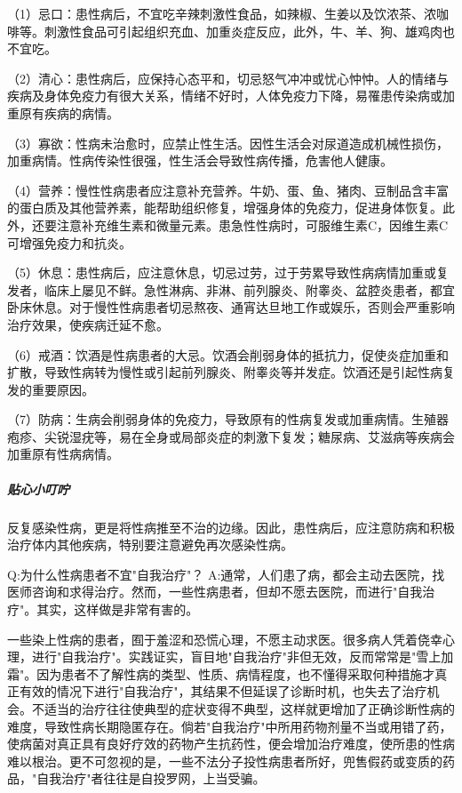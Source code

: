 \documentclass[12pt,UTF8]{ctexbook}
\begin{document}
（1）忌口：患性病后，不宜吃辛辣刺激性食品，如辣椒、生姜以及饮浓茶、浓咖啡等。刺激性食品可引起组织充血、加重炎症反应，此外，牛、羊、狗、雄鸡肉也不宜吃。

（2）清心：患性病后，应保持心态平和，切忌怒气冲冲或忧心忡忡。人的情绪与疾病及身体免疫力有很大关系，情绪不好时，人体免疫力下降，易罹患传染病或加重原有疾病的病情。

（3）寡欲：性病未治愈时，应禁止性生活。因性生活会对尿道造成机械性损伤，加重病情。性病传染性很强，性生活会导致性病传播，危害他人健康。

（4）营养：慢性性病患者应注意补充营养。牛奶、蛋、鱼、猪肉、豆制品含丰富的蛋白质及其他营养素，能帮助组织修复，增强身体的免疫力，促进身体恢复。此外，还要注意补充维生素和微量元素。患急性性病时，可服维生素C，因维生素C可增强免疫力和抗炎。

（5）休息：患性病后，应注意休息，切忌过劳，过于劳累导致性病病情加重或复发者，临床上屡见不鲜。急性淋病、非淋、前列腺炎、附睾炎、盆腔炎患者，都宜卧床休息。对于慢性性病患者切忌熬夜、通宵达旦地工作或娱乐，否则会严重影响治疗效果，使疾病迁延不愈。

（6）戒酒：饮酒是性病患者的大忌。饮酒会削弱身体的抵抗力，促使炎症加重和扩散，导致性病转为慢性或引起前列腺炎、附睾炎等并发症。饮酒还是引起性病复发的重要原因。

（7）防病：生病会削弱身体的免疫力，导致原有的性病复发或加重病情。生殖器疱疹、尖锐湿疣等，易在全身或局部炎症的刺激下复发；糖尿病、艾滋病等疾病会加重原有性病病情。

\subparagraph{贴心小叮咛}

反复感染性病，更是将性病推至不治的边缘。因此，患性病后，应注意防病和积极治疗体内其他疾病，特别要注意避免再次感染性病。

Q:为什么性病患者不宜"自我治疗"？
A:通常，人们患了病，都会主动去医院，找医师咨询和求得治疗。然而，一些性病患者，但却不愿去医院，而进行"自我治疗"。其实，这样做是非常有害的。

一些染上性病的患者，囿于羞涩和恐慌心理，不愿主动求医。很多病人凭着侥幸心理，进行"自我治疗"。实践证实，盲目地"自我治疗"非但无效，反而常常是"雪上加霜"。因为患者不了解性病的类型、性质、病情程度，也不懂得采取何种措施才真正有效的情况下进行"自我治疗"，其结果不但延误了诊断时机，也失去了治疗机会。不适当的治疗往往使典型的症状变得不典型，这样就更增加了正确诊断性病的难度，导致性病长期隐匿存在。倘若"自我治疗"中所用药物剂量不当或用错了药，使病菌对真正具有良好疗效的药物产生抗药性，便会增加治疗难度，使所患的性病难以根治。更不可忽视的是，一些不法分子投性病患者所好，兜售假药或变质的药品，"自我治疗"者往往是自投罗网，上当受骗。
\end{document}
